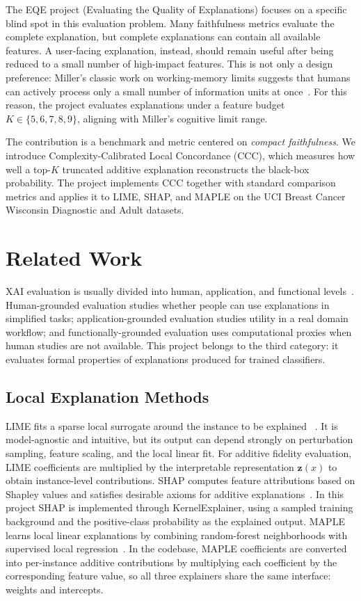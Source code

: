 \documentclass[sigconf,nonacm]{acmart}
\begin{document}
The EQE project (Evaluating the Quality of Explanations) focuses on a specific
blind spot in this evaluation problem. Many faithfulness metrics evaluate the
complete explanation, but complete explanations can contain all available
features. A user-facing explanation, instead, should remain useful after being
reduced to a small number of high-impact features. This is not only a design
preference: Miller's classic work on working-memory limits suggests that humans
can actively process only a small number of information units at once~\cite{miller1956magical}.
For this reason, the project evaluates explanations under a feature budget
$K \in \{5,6,7,8,9\}$, aligning with Miller's cognitive limit range.

The contribution is a benchmark and metric centered on \emph{compact
faithfulness}. We introduce Complexity-Calibrated Local Concordance (CCC), which
measures how well a top-$K$ truncated additive explanation reconstructs the
black-box probability. The project implements CCC together with standard
comparison metrics and applies it to LIME, SHAP, and MAPLE on the UCI Breast
Cancer Wisconsin Diagnostic and Adult datasets.

\section{Related Work}
XAI evaluation is usually divided into human, application, and functional
levels~\cite{doshi2017towards}.
Human-grounded evaluation studies whether people can use explanations in
simplified tasks; application-grounded evaluation studies utility in a real
domain workflow; and functionally-grounded evaluation uses computational proxies
when human studies are not available. This project belongs to the third
category: it evaluates formal properties of explanations produced for trained
classifiers.

\subsection{Local Explanation Methods}
LIME fits a sparse local surrogate around the instance to be explained
~\cite{ribeiro2016lime}. It is model-agnostic and intuitive, but its output can
depend strongly on perturbation sampling, feature scaling, and the local linear
fit. For additive fidelity evaluation, LIME coefficients are multiplied by the
interpretable representation $\mathbf{z}(x)$ to obtain instance-level contributions.
SHAP computes feature attributions based on Shapley values and satisfies
desirable axioms for additive explanations~\cite{lundberg2017shap}. In this
project SHAP is implemented through KernelExplainer, using a sampled training
background and the positive-class probability as the explained output. MAPLE
learns local linear explanations by combining random-forest neighborhoods with
supervised local regression~\cite{plumb2018maple}. In the codebase, MAPLE
coefficients are converted into per-instance additive contributions by
multiplying each coefficient by the corresponding feature value, so all three
explainers share the same interface: weights and intercepts.
\end{document}

